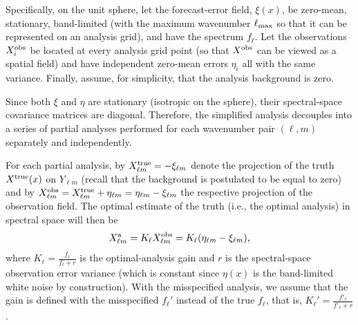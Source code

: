 \documentclass[12pt]{article}
\newcommand{\ie}{i.e., }
\begin{document}
Specifically, on the unit sphere, let the forecast-error field, $\xi(x)$, be zero-mean, stationary, band-limited 
(with the maximum wavenumber $\ell_{\rm max}$ so that it can be represented on an  analysis grid),
and have the spectrum $f_\ell$.
Let the observations $X^{\rm obs}_i$ be located at every analysis grid point
(so that $X^{\rm obs}$ can be viewed as a spatial field) and
have independent zero-mean errors $\eta_i$ all
with the same variance. 
Finally, assume, for simplicity, that the analysis background is zero.

Since both $\xi$ and $\eta$ are stationary (isotropic on the sphere), 
their spectral-space covariance matrices are diagonal. Therefore, the simplified
analysis decouples into a series of partial analyses performed for each wavenumber pair $(\ell,m)$
separately and independently.

For each partial analysis, by $X^{\rm true}_{\ell m} = -\xi_{\ell m}$ denote the projection of the truth
$X^{\rm true}(x)$
on $Y_{\ell m}$ (recall that the background is postulated to be equal to zero) and
by $X^{\rm obs}_{\ell m} = X^{\rm true}_{\ell m} + \eta_{\ell m} = \eta_{\ell m} - \xi_{\ell m}$
the respective projection of the observation field.
The optimal estimate of the truth (\ie the optimal analysis) in spectral space will then be
%
\begin {equation}
\label{XaOpt}
X^{\rm a}_{\ell m} = K_\ell X^{\rm obs}_{\ell m} = K_\ell (\eta_{\ell m} - \xi_{\ell m}),
\end {equation}
%
where
$K_\ell = \frac{f_\ell}{f_\ell + r}$
%
is the optimal-analysis gain and 
$r$ is the spectral-space observation error variance (which is constant since $\eta(x)$ is 
the band-limited white noise by construction). 
With the misspecified analysis, we assume that the gain is defined with the
misspecified $f_\ell'$ instead of the true $f_\ell$, that is, 
$K_\ell' = \frac{f'_\ell}{f'_\ell + r}$.
\end{document}
